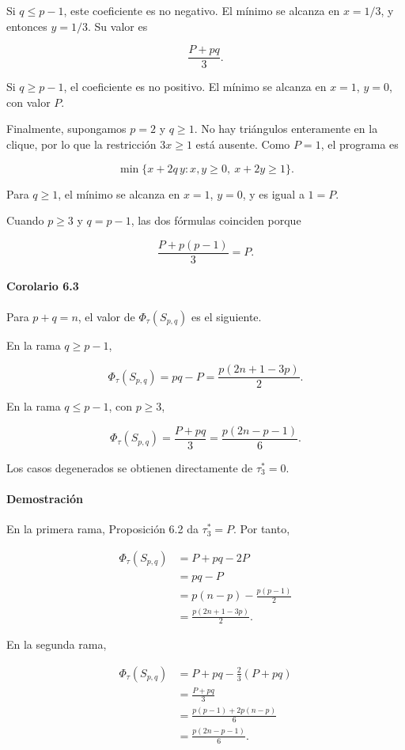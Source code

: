 \documentclass[
  spanish,
  11pt,
  a4paper,
]{article}
\begin{document}
Si \(q\le p-1\), este coeficiente es no negativo. El mínimo se alcanza en \(x=1/3\), y entonces \(y=1/3\). Su valor es

\[
\frac{P+pq}{3}.
\]

Si \(q\ge p-1\), el coeficiente es no positivo. El mínimo se alcanza en \(x=1\), \(y=0\), con valor \(P\).

Finalmente, supongamos \(p=2\) y \(q\ge1\). No hay triángulos enteramente en la clique, por lo que la restricción \(3x\ge1\) está ausente. Como \(P=1\), el programa es

\[
\min\{x+2q\,y:x,y\ge0,\ x+2y\ge1\}.
\]

Para \(q\ge1\), el mínimo se alcanza en \(x=1\), \(y=0\), y es igual a \(1=P\).

Cuando \(p\ge3\) y \(q=p-1\), las dos fórmulas coinciden porque

\[
\frac{P+p(p-1)}{3}=P.
\]

\paragraph{Corolario 6.3}\label{corolario-6.3}

Para \(p+q=n\), el valor de \(\Phi_\tau(S_{p,q})\) es el siguiente.

En la rama \(q\ge p-1\),

\[
\Phi_\tau(S_{p,q})
=
pq-P
=
\frac{p(2n+1-3p)}2.
\tag{6.1}
\]

En la rama \(q\le p-1\), con \(p\ge3\),

\[
\Phi_\tau(S_{p,q})
=
\frac{P+pq}{3}
=
\frac{p(2n-p-1)}6.
\tag{6.2}
\]

Los casos degenerados se obtienen directamente de \(\tau_3^*=0\).

\paragraph{Demostración}\label{demostraciuxf3n-10}

En la primera rama, Proposición 6.2 da \(\tau_3^*=P\). Por tanto,

\[
\begin{aligned}
\Phi_\tau(S_{p,q})
&=
P+pq-2P\\
&=
pq-P\\
&=
p(n-p)-\frac{p(p-1)}2\\
&=
\frac{p(2n+1-3p)}2.
\end{aligned}
\]

En la segunda rama,

\[
\begin{aligned}
\Phi_\tau(S_{p,q})
&=
P+pq-\frac23(P+pq)\\
&=
\frac{P+pq}{3}\\
&=
\frac{p(p-1)+2p(n-p)}6\\
&=
\frac{p(2n-p-1)}6.
\end{aligned}
\]
\end{document}
